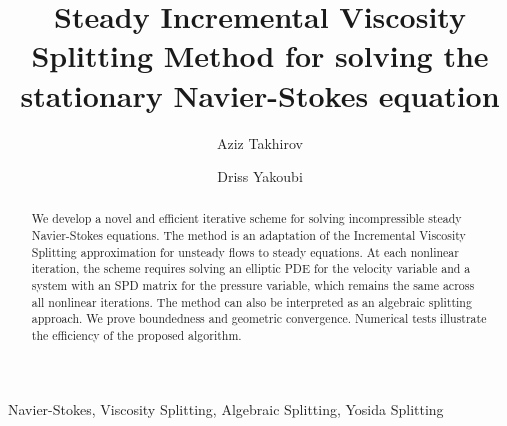 \documentclass[3p]{elsarticle}
\newcommand{\DY}[1]{{\color{black}{#1}}}
\begin{document}
\begin{frontmatter}

\title{Steady Incremental Viscosity Splitting Method for solving the stationary Navier-Stokes equation} 

\author[labelA]{Aziz Takhirov} %
\address[labelA]{Department of Mathematics, University of Sharjah, UAE}
\author[labelB]{Driss Yakoubi}%
\address[labelB]{De Vinci Higher Education, De Vinci Research Center, Paris, France.}
 
 
 


\begin{abstract}

We develop a novel and efficient iterative scheme for solving incompressible steady Navier-Stokes equations. The method is an adaptation of the Incremental Viscosity Splitting approximation for unsteady flows \cite{Yak2023} to steady equations. At each nonlinear iteration, the scheme requires solving an elliptic PDE for the velocity variable and a system with an SPD matrix for the pressure variable, which remains the same across all nonlinear iterations. The method can also be interpreted as an algebraic splitting approach. We prove boundedness and geometric convergence. Numerical tests illustrate the efficiency of the proposed algorithm.  
\end{abstract}

\begin{keyword}
Navier-Stokes, Viscosity Splitting, Algebraic Splitting, Yosida Splitting
\end{keyword}

\end{frontmatter}
\end{document}
